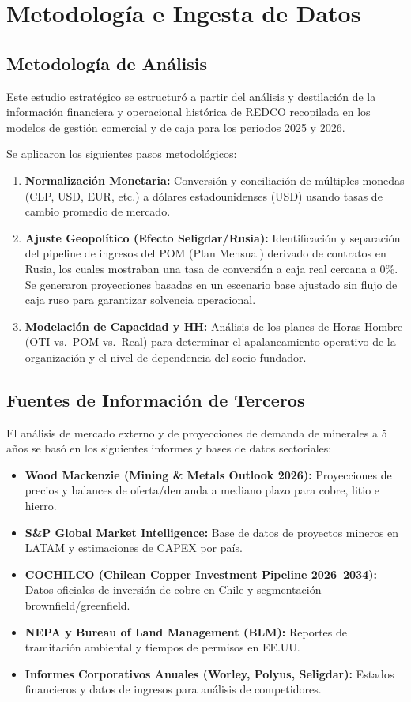 \appendix

\chapter{Metodología e Ingesta de Datos}

\section{Metodología de Análisis}

Este estudio estratégico se estructuró a partir del análisis y destilación de la información financiera y operacional histórica de REDCO recopilada en los modelos de gestión comercial y de caja para los periodos 2025 y 2026. 

Se aplicaron los siguientes pasos metodológicos:
\begin{enumerate}
    \item \textbf{Normalización Monetaria:} Conversión y conciliación de múltiples monedas (CLP, USD, EUR, etc.) a dólares estadounidenses (USD) usando tasas de cambio promedio de mercado.
    \item \textbf{Ajuste Geopolítico (Efecto Seligdar/Rusia):} Identificación y separación del pipeline de ingresos del POM (Plan Mensual) derivado de contratos en Rusia, los cuales mostraban una tasa de conversión a caja real cercana a 0\%. Se generaron proyecciones basadas en un escenario base ajustado sin flujo de caja ruso para garantizar solvencia operacional.
    \item \textbf{Modelación de Capacidad y HH:} Análisis de los planes de Horas-Hombre (OTI vs.\ POM vs.\ Real) para determinar el apalancamiento operativo de la organización y el nivel de dependencia del socio fundador.
\end{enumerate}

\section{Fuentes de Información de Terceros}

El análisis de mercado externo y de proyecciones de demanda de minerales a 5 años se basó en los siguientes informes y bases de datos sectoriales:
\begin{itemize}
    \item \textbf{Wood Mackenzie (Mining \& Metals Outlook 2026):} Proyecciones de precios y balances de oferta/demanda a mediano plazo para cobre, litio e hierro.
    \item \textbf{S\&P Global Market Intelligence:} Base de datos de proyectos mineros en LATAM y estimaciones de CAPEX por país.
    \item \textbf{COCHILCO (Chilean Copper Investment Pipeline 2026--2034):} Datos oficiales de inversión de cobre en Chile y segmentación brownfield/greenfield.
    \item \textbf{NEPA y Bureau of Land Management (BLM):} Reportes de tramitación ambiental y tiempos de permisos en EE.UU.
    \item \textbf{Informes Corporativos Anuales (Worley, Polyus, Seligdar):} Estados financieros y datos de ingresos para análisis de competidores.
\end{itemize}
